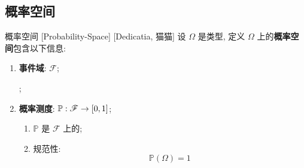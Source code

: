 \documentclass[UTF8]{ctexart}
\begin{document}





    \subsection{概率空间}

        \begin{str}
            {概率空间}
            [Probability-Space]
            [Dedicatia, 猫猫]
            设 \(\Omega\) 是类型, 定义 \(\Omega\) 上的\textbf{概率空间}包含以下信息: 
            \begin{enumerate}
                \item \textbf{事件域}: \(\mathscr{F}\); 
                    
                    ; 

                \item \textbf{概率测度}: \(\mathbb{P}: \mathscr{F}\to\Icc{0}{1}\); 
                    \begin{enumerate}
                        \item \(\mathbb{P}\) 是 \(\mathscr{F}\) 上的; 
                        \item 规范性: 
                            \[\mathbb{P}(\Omega)=1\]
                    \end{enumerate}
            \end{enumerate}
        \end{str}
\end{document}
